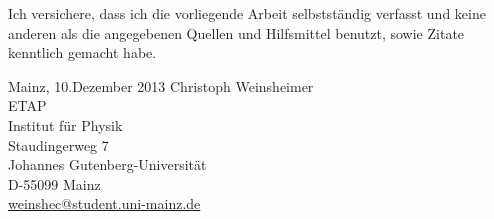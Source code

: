 \newpage
\thispagestyle{empty}
\mbox{}

\newpage
\thispagestyle{empty}
Ich versichere, dass ich die vorliegende Arbeit selbstständig verfasst und keine anderen
als die angegebenen Quellen und Hilfsmittel benutzt, sowie Zitate kenntlich gemacht habe.

\vspace*{4cm}

Mainz, 10.Dezember 2013
\vfill
\noindent Christoph Weinsheimer\\
ETAP\\
Institut für Physik\\
Staudingerweg 7\\
Johannes Gutenberg-Universität\\
D-55099 Mainz\\
\url{weinshec@student.uni-mainz.de}

